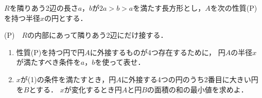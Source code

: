 \documentclass[../../main.tex]{subfiles}
\begin{document}
$R$を隣りあう2辺の長さ$a$，$b$が$2a>b>a$を満たす長方形とし，$A$を次の性質(P)を持つ半径$x$の円とする．

\begin{center}
  (P)　$R$の内部にあって隣りあう2辺にだけ接する．
\end{center}

\begin{enumerate}
  \item 性質(P)を持つ円で円$A$に外接するものが4つ存在するために，
    円$A$の半径$x$が満たすべき条件を$a$，$b$を使って表せ．
  \item $x$が(1)の条件を満たすとき，円$A$に外接する4つの円のうち2番目に大きい円を$B$とする．
    $x$が変化するとき円$A$と円$B$の面積の和の最小値を求めよ．
\end{enumerate}
\end{document}
